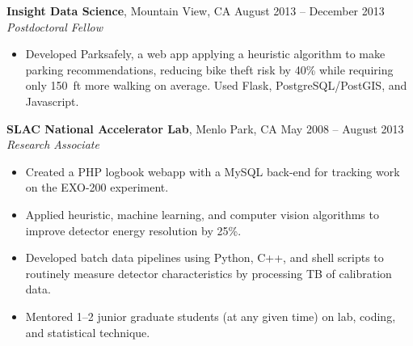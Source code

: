 \documentclass[margin,line]{resume}
\begin{document}
\begin{resume}
    \textbf{Insight Data Science}, Mountain View, CA \hfill August 2013 -- December 2013\vspace{1mm}\\\vspace{1mm}%
    \textsl{Postdoctoral Fellow}
    \begin{itemize}
    \item Developed Parksafely, a web app applying a heuristic algorithm to make parking recommendations, reducing bike theft risk by 40\% while requiring only 150~ft more walking on average. Used Flask, PostgreSQL/PostGIS, and Javascript.
    \end{itemize}

    \textbf{SLAC National Accelerator Lab}, Menlo Park, CA \hfill May 2008 -- August 2013\vspace{1mm}\\\vspace{1mm}%
    \textsl{Research Associate}
    \begin{itemize}
    \item Created a PHP logbook webapp with a MySQL back-end for tracking work on the EXO-200 experiment.
    \item Applied heuristic, machine learning, and computer vision algorithms to improve detector energy resolution by 25\%.
    \item Developed batch data pipelines using Python, C++, and shell scripts to routinely measure detector characteristics by processing TB of calibration data.
    \item Mentored 1--2 junior graduate students (at any given time) on lab, coding, and statistical technique.
    \end{itemize}
    
    

\end{resume}
\end{document}
